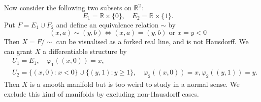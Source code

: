 \documentclass[twoside]{article}
\begin{document}
			Now consider the following two subsets on $\mathbb{R}^2$:
			\[
				E_1 = \mathbb{R} \times \{0\}, \quad E_2 = \mathbb{R} \times \{1\}.
			\]
			Put $F=E_1 \cup F_2$ and define an equivalence relation $\sim$ by
			\[
				(x,a)\sim(y,b) \iff \text{$(x,a)=(y,b)$ or $x=y<0$}
			\]
			Then $X=F/\sim$ can be visualised as a forked real line, and is not Hausdorff. We can grant $X$ a differentiable structure by
			\[
				\begin{aligned}
					&U_1 = E_1, \quad \varphi_1((x,0))=x, \\
					&U_2 = \{(x,0):x<0\} \cup \{(y,1):y \ge 1\}, \quad \varphi_2((x,0))=x, \varphi_2((y,1))=y.
				\end{aligned}
			\]
			Then $X$ is a smooth manifold but is too weird to study in a normal sense. We exclude this kind of manifolds by excluding non-Hausdorff cases.
\end{document}

